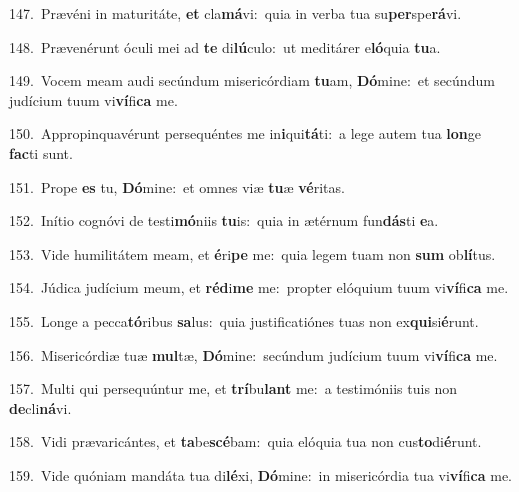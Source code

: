 {\numbfont\textcolor{\numbcolor}{147.}}~Prævéni in maturitáte, \textbf{et} cla\-\textbf{má}\-vi:~\star quia in verba tua su\-\textbf{per}\-spe\-\textbf{rá}\-vi.\par
{\numbfont\textcolor{\numbcolor}{148.}}~Prævenérunt óculi mei ad \textbf{te} di\-\textbf{lú}\-culo:~\star ut meditárer e\-\textbf{ló}\-quia \textbf{tu}\-a.\par
{\numbfont\textcolor{\numbcolor}{149.}}~Vocem meam audi secúndum misericórdiam \textbf{tu}\-am, \textbf{Dó}\-mine:~\star et secúndum judícium tuum vi\-\textbf{ví}\-fi\textbf{ca} me.\par
{\numbfont\textcolor{\numbcolor}{150.}}~Appropinquavérunt persequéntes me in\-\textbf{i}\-qui\-\textbf{tá}\-ti:~\star a lege autem tua \textbf{lon}\-ge \textbf{fac}\-ti sunt.\par
{\numbfont\textcolor{\numbcolor}{151.}}~Prope \textbf{es} tu, \textbf{Dó}\-mine:~\star et omnes viæ \textbf{tu}\-æ \textbf{vé}\-ritas.\par
{\numbfont\textcolor{\numbcolor}{152.}}~Inítio cognóvi de testi\-\textbf{mó}\-niis \textbf{tu}\-is:~\star quia in ætérnum fun\-\textbf{dás}\-ti \textbf{e}\-a.\par
{\numbfont\textcolor{\numbcolor}{153.}}~Vide humilitátem meam, et \textbf{é}\-ri\textbf{pe} me:~\star quia legem tuam non \textbf{sum} ob\-\textbf{lí}\-tus.\par
{\numbfont\textcolor{\numbcolor}{154.}}~Júdica judícium meum, et \textbf{réd}\-i\textbf{me} me:~\star propter elóquium tuum vi\-\textbf{ví}\-fi\textbf{ca} me.\par
{\numbfont\textcolor{\numbcolor}{155.}}~Longe a pecca\-\textbf{tó}\-ribus \textbf{sa}\-lus:~\star quia justificatiónes tuas non ex\-\textbf{qui}\-si\-\textbf{é}\-runt.\par
{\numbfont\textcolor{\numbcolor}{156.}}~Misericórdiæ tuæ \textbf{mul}\-tæ, \textbf{Dó}\-mine:~\star secúndum judícium tuum vi\-\textbf{ví}\-fi\textbf{ca} me.\par
{\numbfont\textcolor{\numbcolor}{157.}}~Multi qui persequúntur me, et \textbf{trí}\-bu\textbf{lant} me:~\star a testimóniis tuis non \textbf{de}\-cli\-\textbf{ná}\-vi.\par
{\numbfont\textcolor{\numbcolor}{158.}}~Vidi prævaricántes, et \textbf{ta}\-be\-\textbf{scé}\-bam:~\star quia elóquia tua non cus\-\textbf{to}\-di\-\textbf{é}\-runt.\par
{\numbfont\textcolor{\numbcolor}{159.}}~Vide quóniam mandáta tua di\-\textbf{lé}\-xi, \textbf{Dó}\-mine:~\star in misericórdia tua vi\-\textbf{ví}\-fi\textbf{ca} me.\par
